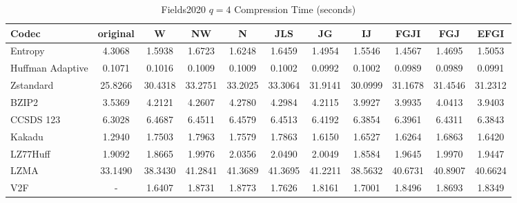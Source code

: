\documentclass{article}
\begin{document}
\begin{table}[h!]
\centering
\caption{Fields2020 $q=4$ Compression Time (seconds)}
\begin{tabular}{|l|cccccccccc|}
\hline
Codec &  original &       W &      NW &       N &     JLS &      JG &      IJ &    FGJI &     FGJ &    EFGI \\
\hline
Entropy & 4.3068 & 1.5938 & 1.6723 & 1.6248 & 1.6459 & 1.4954 & 1.5546 & 1.4567 & 1.4695 & 1.5053         \\
\hline
Huffman Adaptive &    0.1071 &  0.1016 &  0.1009 &  0.1009 &  0.1002 &  0.0992 &  0.1002 &  0.0989 &  0.0989 &  0.0991 \\
Zstandard        &   25.8266 & 30.4318 & 33.2751 & 33.2025 & 33.3064 & 31.9141 & 30.0999 & 31.1678 & 31.4546 & 31.2312 \\
BZIP2            &    3.5369 &  4.2121 &  4.2607 &  4.2780 &  4.2984 &  4.2115 &  3.9927 &  3.9935 &  4.0413 &  3.9403 \\
CCSDS 123        &    6.3028 &  6.4687 &  6.4511 &  6.4579 &  6.4513 &  6.4192 &  6.3854 &  6.3961 &  6.4311 &  6.3843 \\
Kakadu           &    1.2940 &  1.7503 &  1.7963 &  1.7579 &  1.7863 &  1.6150 &  1.6527 &  1.6264 &  1.6863 &  1.6420 \\
LZ77Huff         &    1.9092 &  1.8665 &  1.9976 &  2.0356 &  2.0490 &  2.0049 &  1.8584 &  1.9645 &  1.9970 &  1.9447 \\
LZMA             &   33.1490 & 38.3430 & 41.2841 & 41.3689 & 41.3695 & 41.2211 & 38.5632 & 40.6731 & 40.8907 & 40.6624 \\
V2F              &    - &  1.6407 &  1.8731 &  1.8773 &  1.7626 &  1.8161 &  1.7001 &  1.8496 &  1.8693 &  1.8349 \\
\hline
\end{tabular}
\end{table}

\newpage
\end{document}
